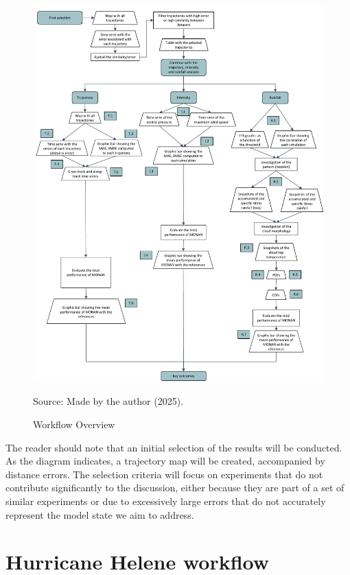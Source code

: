 \begin{figure}[p]
    \centering
    \caption{Workflow Overview}
    \label{fig:workflow}\includegraphics[width=\textwidth,height=\textheight,keepaspectratio]{docs/figuras/chapter4/BERYL_worflow_01.pdf}

    \vspace{0.5em}
    
    \centering
    Source: Made by the author (2025).
\end{figure}

The reader should note that an initial selection of the results will be conducted. As the diagram indicates, a trajectory map will be created, accompanied by distance errors. The selection criteria will focus on experiments that do not contribute significantly to the discussion, either because they are part of a set of similar experiments or due to excessively large errors that do not accurately represent the model state we aim to address.

\section{Hurricane Helene workflow}